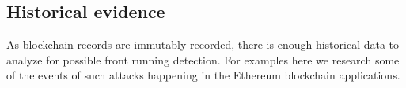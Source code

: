%
%
%
%
%


\subsection{Historical evidence}
As blockchain records are immutably recorded, there is enough historical data to analyze for possible front running detection. For examples here we research some of the events of such attacks happening in the Ethereum blockchain applications.



